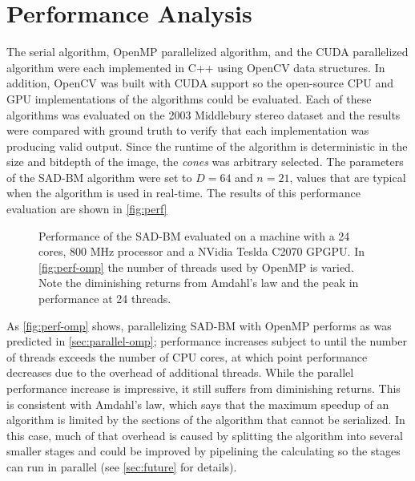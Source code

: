 \documentclass{article}
\let\orgautoref\autoref
\providecommand{\Autoref}
        {\def\equationautorefname{Equation}%
         \def\figureautorefname{Figure}%
         \def\subfigureautorefname{Figure}%
         \def\Itemautorefname{Item}%
         \def\tableautorefname{Table}%
         \def\sectionautorefname{Section}%
         \def\subsectionautorefname{Section}%
         \def\subsubsectionautorefname{Section}%
         \def\chapterautorefname{Section}%
         \def\partautorefname{Part}%
         \orgautoref}
\begin{document}
\section{Performance Analysis}
\label{sec:perf}
The serial algorithm, OpenMP parallelized algorithm, and the CUDA parallelized
algorithm were each implemented in C++ using OpenCV data structures. In
addition, OpenCV was built with CUDA support so the open-source CPU and GPU
implementations of the algorithms could be evaluated. Each of these algorithms
was evaluated on the 2003 Middlebury stereo dataset and the results were
compared with ground truth to verify that each implementation was producing
valid output. Since the runtime of the algorithm is deterministic in the size
and bitdepth of the image, the \textit{cones} was arbitrary selected. The
parameters of the SAD-BM algorithm were set to $D = 64$ and $n = 21$, values
that are typical when the algorithm is used in real-time. The results of this
performance evaluation are shown in \Autoref{fig:perf}

\begin{figure}
    \caption{
        Performance of the SAD-BM evaluated on a machine with a 24 cores, 800
        MHz processor and a NVidia Teslda C2070 GPGPU. In \ref{fig:perf-omp}
        the number of threads used by OpenMP is varied. Note the diminishing
        returns from Amdahl's law and the peak in performance at 24 threads.
    }
    \label{fig:perf}
\end{figure}

As \Autoref{fig:perf-omp} shows, parallelizing SAD-BM with OpenMP performs as
was predicted in \Autoref{sec:parallel-omp}; performance increases subject to
until the number of threads exceeds the number of CPU cores, at which point
performance decreases due to the overhead of additional threads. While the
parallel performance increase is impressive, it still suffers from diminishing
returns. This is consistent with Amdahl's law, which says that the maximum
speedup of an algorithm is limited by the sections of the algorithm that cannot
be serialized. In this case, much of that overhead is caused by splitting the
algorithm into several smaller stages and could be improved by pipelining the
calculating so the stages can run in parallel (see \Autoref{sec:future} for
details).
\end{document}
